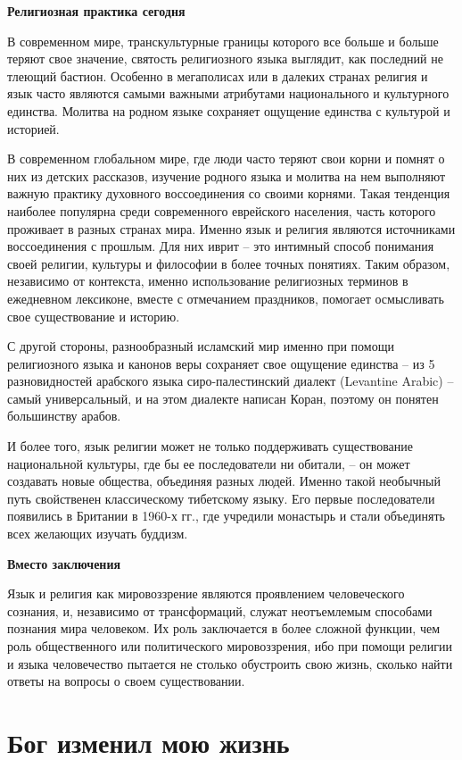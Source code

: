 \textbf{Религиозная практика сегодня}

В современном мире, транскультурные границы которого все больше и больше теряют свое значение, святость религиозного языка выглядит, как последний не тлеющий бастион. Особенно в мегаполисах или в далеких странах религия и язык часто являются самыми важными атрибутами национального и культурного единства. Молитва на родном языке сохраняет ощущение единства с культурой и историей.

В современном глобальном мире, где люди часто теряют свои корни и помнят о них из детских рассказов, изучение родного языка и молитва на нем выполняют важную практику духовного воссоединения со своими корнями. Такая тенденция наиболее популярна среди современного еврейского населения, часть которого проживает в разных странах мира. Именно язык и религия являются источниками воссоединения с прошлым. Для них иврит – это интимный способ понимания своей религии, культуры и философии в более точных понятиях. Таким образом, независимо от контекста, именно использование религиозных терминов в ежедневном лексиконе, вместе с отмечанием праздников, помогает осмысливать свое существование и историю.

С другой стороны, разнообразный исламский мир именно при помощи религиозного языка и канонов веры сохраняет свое ощущение единства – из 5 разновидностей арабского языка сиро-палестинский диалект (Levantine Arabic) – самый универсальный, и на этом диалекте написан Коран, поэтому он понятен большинству арабов.

И более того, язык религии может не только поддерживать существование национальной культуры, где бы ее последователи ни обитали, – он может создавать новые общества, объединяя разных людей. Именно такой необычный путь свойственен классическому тибетскому языку. Его первые последователи появились в Британии в 1960-х гг., где учредили монастырь и стали объединять всех желающих изучать буддизм.

\textbf{Вместо заключения}

Язык и религия как мировоззрение являются проявлением человеческого сознания, и, независимо от трансформаций, служат неотъемлемым способами познания мира человеком. Их роль заключается в более сложной функции, чем роль общественного или политического мировоззрения, ибо при помощи религии и языка человечество пытается не столько обустроить свою жизнь, сколько найти ответы на вопросы о своем существовании.


\newpage
\section{Бог изменил мою жизнь}

